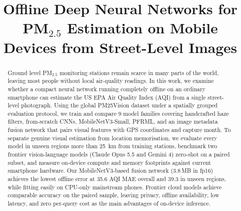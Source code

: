 \documentclass[conference]{IEEEtran}
\newcommand{\pmtwofive}{PM$_{2.5}$}
\begin{document}
\title{Offline Deep Neural Networks for \pmtwofive{} Estimation on Mobile Devices from Street-Level Images}

\author{
  \and {}
  \and {}
}

\maketitle

\begin{abstract}
Ground level \pmtwofive{} monitoring stations remain scarce in many parts of
the world, leaving most people without local air-quality readings. In this
work, we examine whether a compact neural network running completely offline on
an ordinary smartphone can estimate the US EPA Air Quality Index (AQI) from a
single street-level photograph. Using the global PM25Vision dataset under a
spatially grouped evaluation protocol, we train and compare 9 model families
covering handcrafted haze filters, from-scratch CNNs, MobileNetV3-Small, PFRML,
and an image metadata fusion network that pairs visual features with GPS
coordinates and capture month. To separate genuine visual estimation from
location memorisation, we evaluate every model in unseen regions more than 25~km
from training stations, benchmark two frontier vision-language models (Claude
Opus 5.5 and Gemini 4) zero-shot on a paired subset, and measure on-device
compute and memory footprints against current smartphone hardware. Our
MobileNetV3-based fusion network (3.8\,MB in fp16) achieves the lowest offline
error at 35.6 AQI MAE overall and 39.3 in unseen regions, while fitting easily
on CPU-only mainstream phones. Frontier cloud models achieve comparable
accuracy on the paired sample, leaving privacy, offline availability, low
latency, and zero per-query cost as the main advantages of on-device inference.
\end{abstract}
\end{document}
